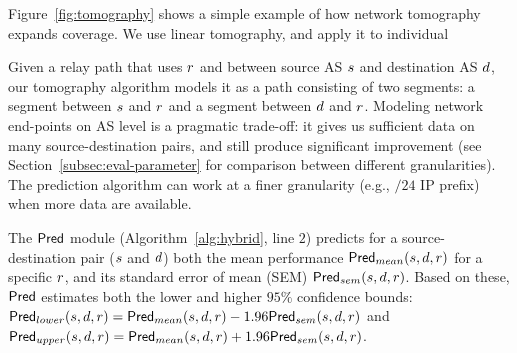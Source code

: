 Figure~\ref{fig:tomography} shows a simple example of how network tomography expands coverage. We use linear tomography, and apply it to individual 

Given a relay path that uses \option $r$ and between source AS $s$ and destination AS $d$, our tomography algorithm models it as a path consisting of two segments: a segment between $s$ and $r$ and a segment between $d$ and $r$. 
Modeling network end-points on AS level is a pragmatic trade-off: it gives us sufficient data on many source-destination pairs, and still produce significant improvement (see Section~\ref{subsec:eval-parameter} for comparison between different granularities).
The prediction algorithm can work at a finer granularity (e.g., $/24$ IP prefix) when more data are available.



The ${\sf\small Pred}$ module (Algorithm~\ref{alg:hybrid}, line $2$) predicts for a source-destination pair ($s$ and $d$) both the mean performance ${\sf\small Pred}_{mean}(s,d,r)$ for a specific \option $r$, and its standard error of mean (SEM) ${\sf\small Pred}_{sem}(s,d,r)$. %
Based on these, ${\sf\small Pred}$ estimates both the lower and higher $95\%$ confidence bounds: ${\sf\small Pred}_{lower}(s,d,r)={\sf\small Pred}_{mean}(s,d,r)-1.96{\sf\small Pred}_{sem}(s,d,r)$ and ${\sf\small Pred}_{upper}(s,d,r)={\sf\small Pred}_{mean}(s,d,r)+1.96{\sf\small Pred}_{sem}(s,d,r)$.

